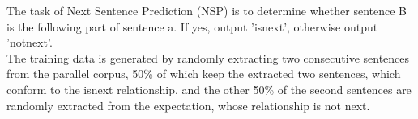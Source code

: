 \documentclass{tikzposter} %
\begin{document}
\begin{columns}
{%


\begin{description}

  	\item
   The task of Next Sentence Prediction (NSP) is to determine whether sentence B
   is the following part of sentence a. If yes, output 'isnext', otherwise
   output 'notnext'. \\The training data is generated by randomly extracting
   two consecutive sentences from the parallel corpus, 50\% of which keep
   the extracted two sentences, which conform to the isnext relationship,
   and the other 50\% of the second sentences are randomly extracted from the
   expectation, whose relationship is not next.

\end{description}


}







\end{columns}
\end{document}
